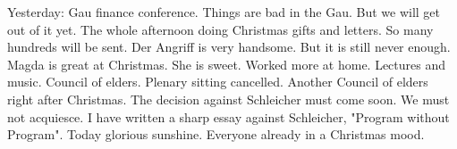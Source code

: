 Yesterday: Gau finance conference. Things are bad in the Gau. But we will get out of it yet. The whole afternoon doing Christmas gifts and letters. So many hundreds will be sent. Der Angriff is very handsome. But it is still never enough. Magda is great at Christmas. She is sweet. Worked more at home. Lectures and music. Council of elders. Plenary sitting cancelled. Another Council of elders right after Christmas. The decision against Schleicher must come soon. We must not acquiesce. I have written a sharp essay against Schleicher, "Program without Program".  Today glorious sunshine. Everyone already in a Christmas mood.